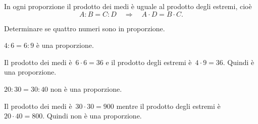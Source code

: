 %
%
%

\begin{proprieta}
  In ogni proporzione il prodotto dei medi è uguale al prodotto degli estremi, cioè
\[A:B=C:D\quad\Rightarrow\quad A\cdot D=B\cdot C.\]
\end{proprieta}

\begin{exrig}
\begin{esempio}
Determinare se quattro numeri sono in proporzione.
\begin{itemize*}
  \item $4:6=6:9$ è una proporzione.
  
  Il prodotto dei medi è~$6\cdot6=36$ e il prodotto degli estremi è~$4\cdot9=36$. Quindi è una proporzione.
  \item $20:30=30:40$ non è una proporzione.
  
  Il prodotto dei medi è~$30\cdot30=900$ mentre il prodotto degli estremi è~$20\cdot40=800$. Quindi non è una proporzione.
\end{itemize*}
\end{esempio}
\end{exrig}
\begin{comment}
\begin{exrig}
 \begin{esempio}
Verificare se $4:6=6:9$ è una proporzione.

Il prodotto dei medi è~$6\cdot6=36$ e il prodotto degli estremi è~$4\cdot9=36$. Quindi è una proporzione.
 \end{esempio}

\begin{esempio}
Verificare se $20:30=30:40$ è una proporzione.

Il prodotto dei medi è~$30\cdot30=900$ mentre il prodotto degli estremi è~$20\cdot40=800$. Quindi non è una proporzione.
\end{esempio}
\end{exrig}
\end{comment}

